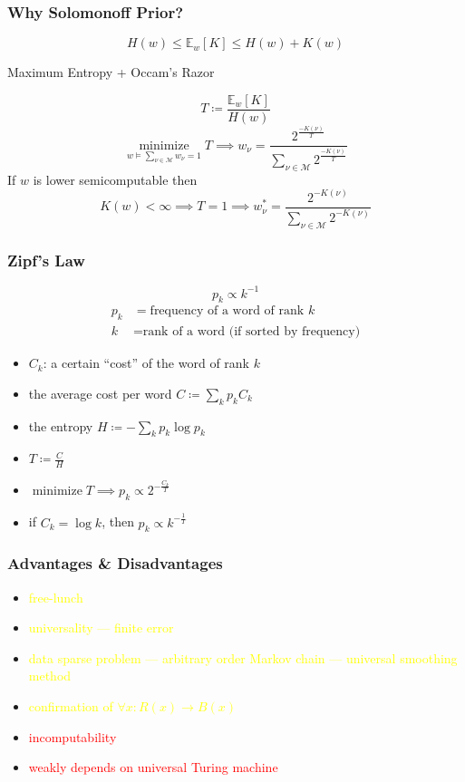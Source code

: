 \documentclass[UTF8,11pt,colorlinks,compress,openany]{beamer}%
\begin{document}
\begin{frame}\frametitle{Why Solomonoff Prior?}
\[H(w)\leq\mathbb{E}_w[K]\leq H(w)+K(w)\]
\begin{block}{}
\centerline{Maximum Entropy + Occam's Razor}
\end{block}
\[T\coloneqq \dfrac{\mathbb{E}_w[K]}{H(w)}\]
\[
\mathop{minimize}\limits_{w\vDash\sum\limits_{\nu\in\mathcal{M}}\!w_\nu=1} T \implies
w_\nu=\dfrac{2^{\frac{-K(\nu)}{T}}}{\sum\limits_{\nu\in\mathcal{M}}2^{\frac{-K(\nu)}{T}}}
\]
If $w$ is lower semicomputable then
\[K(w)<\infty\implies T=1\implies w_\nu^*=\dfrac{2^{-K(\nu)}}{\sum\limits_{\nu\in\mathcal{M}}2^{-K(\nu)}}\]
\end{frame}

\begin{frame}\frametitle{Zipf's Law}
	\[p_k\propto k^{-1}\]
\begin{align*}
p_k &= \mbox{frequency of a word of rank } k\\
k &= \mbox{rank of a word (if sorted by frequency)}
\end{align*}
\begin{itemize}
	\item $C_k$: a certain ``cost'' of the word of rank $k$
	\item the average cost per word $C\coloneqq\sum_k p_k C_k$
	\item the entropy $H\coloneqq -\sum_kp_k\log p_k$
	\item $T\coloneqq\frac{C}{H}$
	\item $\operatorname{minimize} T\implies p_k\propto 2^{-\frac{C_k}{T}}$
	\item if $C_k=\log k$, then $p_k\propto k^{-\frac{1}{T}}$
\end{itemize}
\end{frame}

\begin{frame}\frametitle{Advantages \& Disadvantages}
	\begin{itemize}
		\item \textcolor{yellow}{free-lunch}
		\item \textcolor{yellow}{universality --- finite error}
		\item \textcolor{yellow}{data sparse problem --- arbitrary order Markov chain --- universal smoothing method}
		\item \textcolor{yellow}{confirmation of $\forall x: R(x)\to B(x)$}
		\item \textcolor{red}{incomputability}
		\item \textcolor{red}{weakly depends on universal Turing machine}
	\end{itemize}
\end{frame}
\end{document}
